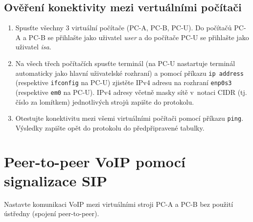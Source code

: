 \subsection{Ověření konektivity mezi vertuálními počítači}
\begin{enumerate}
	\item Spusťte všechny 3 virtuální počítače (PC-A, PC-B, PC-U). Do počítačů PC-A a PC-B se přihlašte jako uživatel \emph{user} a do počítače PC-U se přihlašte jako uživatel \emph{isa}.
	\item Na všech třech počítačích spusťte terminál (na PC-U nastartuje terminál automaticky jako hlavní uživatelské rozhraní) a pomocí příkazu \verb{ip address{ (respektive \verb{ifconfig{ na PC-U) zjistěte IPv4 adresu na rozhraní \verb{enp0s3{ (respektive \verb{em0{ na PC-U). IPv4 adresy včetně masky sítě v~notaci CIDR (tj. číslo za lomítkem) jednotlivých strojů zapište do protokolu.
	\item Otestujte konektivitu mezi všemi virtuálními počítači pomocí příkazu \verb{ping{. Výsledky zapište opět do protokolu do předpřipravené tabulky.
\end{enumerate}


\section{Peer-to-peer VoIP pomocí signalizace SIP}
Nastavte komunikaci VoIP mezi virtuálními stroji PC-A a PC-B bez použití ústředny (spojení peer-to-peer).

